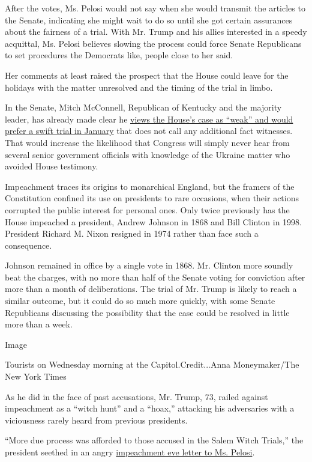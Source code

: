 After the votes, Ms. Pelosi would not say when she would transmit the
articles to the Senate, indicating she might wait to do so until she got
certain assurances about the fairness of a trial. With Mr. Trump and his
allies interested in a speedy acquittal, Ms. Pelosi believes slowing the
process could force Senate Republicans to set procedures the Democrats
like, people close to her said.

Her comments at least raised the prospect that the House could leave for
the holidays with the matter unresolved and the timing of the trial in
limbo.

In the Senate, Mitch McConnell, Republican of Kentucky and the majority
leader, has already made clear he
\href{https://www.nytimes.com/2019/12/13/us/politics/mcconnell-white-house-impeachment-trial.html}{views
the House's case as ``weak'' and would prefer a swift trial in January}
that does not call any additional fact witnesses. That would increase
the likelihood that Congress will simply never hear from several senior
government officials with knowledge of the Ukraine matter who avoided
House testimony.

Impeachment traces its origins to monarchical England, but the framers
of the Constitution confined its use on presidents to rare occasions,
when their actions corrupted the public interest for personal ones. Only
twice previously has the House impeached a president, Andrew Johnson in
1868 and Bill Clinton in 1998. President Richard M. Nixon resigned in
1974 rather than face such a consequence.

Johnson remained in office by a single vote in 1868. Mr. Clinton more
soundly beat the charges, with no more than half of the Senate voting
for conviction after more than a month of deliberations. The trial of
Mr. Trump is likely to reach a similar outcome, but it could do so much
more quickly, with some Senate Republicans discussing the possibility
that the case could be resolved in little more than a week.

Image

Tourists on Wednesday morning at the Capitol.Credit...Anna
Moneymaker/The New York Times

As he did in the face of past accusations, Mr. Trump, 73, railed against
impeachment as a ``witch hunt'' and a ``hoax,'' attacking his
adversaries with a viciousness rarely heard from previous presidents.

``More due process was afforded to those accused in the Salem Witch
Trials,'' the president seethed in an angry
\href{https://www.nytimes.com/interactive/2019/12/17/us/politics/trump-pelosi-letter.html}{impeachment
eve letter to Ms. Pelosi}.

